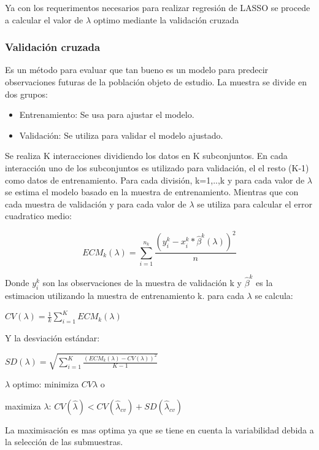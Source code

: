 \documentclass[
]{article}
\newenvironment{Shaded}{\begin{snugshade}}{\end{snugshade}}
\newcommand{\AttributeTok}[1]{\textcolor[rgb]{0.77,0.63,0.00}{#1}}
\newcommand{\DecValTok}[1]{\textcolor[rgb]{0.00,0.00,0.81}{#1}}
\newcommand{\FunctionTok}[1]{\textcolor[rgb]{0.00,0.00,0.00}{#1}}
\newcommand{\NormalTok}[1]{#1}
\newcommand{\OtherTok}[1]{\textcolor[rgb]{0.56,0.35,0.01}{#1}}
\newcommand{\SpecialCharTok}[1]{\textcolor[rgb]{0.00,0.00,0.00}{#1}}
\begin{document}
Ya con los requerimentos necesarios para realizar regresión de LASSO se
procede a calcular el valor de \(\lambda\) optimo mediante la validación
cruzada

\hypertarget{validaciuxf3n-cruzada}{%
\subsubsection{Validación cruzada}\label{validaciuxf3n-cruzada}}

Es un método para evaluar que tan bueno es un modelo para predecir
observaciones futuras de la población objeto de estudio. La muestra se
divide en dos grupos:

\begin{itemize}
\item
  Entrenamiento: Se usa para ajustar el modelo.
\item
  Validación: Se utiliza para validar el modelo ajustado.
\end{itemize}

Se realiza K interacciones dividiendo los datos en K subconjuntos. En
cada interacción uno de los subconjuntos es utilizado para validación,
el el resto (K-1) como datos de entrenamiento. Para cada división,
k=1,..,k y para cada valor de \(\lambda\) se estima el modelo basado en
la muestra de entrenamiento. Mientras que con cada muestra de validación
y para cada valor de \(\lambda\) se utiliza para calcular el error
cuadratico medio:

\[ECM_k(\lambda)= \sum_{i=1}^{n_k}\frac{(y_i^k- x_i^k*\hat{\beta}^k(\lambda))^2}{n}\]

Donde \(y_i^k\) son las observaciones de la muestra de validación k y
\(\hat{\beta}^k\) es la estimacion utilizando la muestra de
entrenamiento k. para cada \(\lambda\) se calcula:

\(CV(\lambda)=\frac{1}{k}\sum_{i=1}^{K}ECM_k(\lambda)\)

Y la desviación estándar:

\(SD(\lambda)=\sqrt{\sum_{i=1}^{K}\frac{(ECM_k(\lambda)-CV(\lambda))^2}{K-1}}\)

\(\lambda\) optimo: minimiza \(CV{\lambda}\) o

maximiza \(\lambda\):
\(CV(\hat{\lambda}) < CV(\hat{\lambda}_{cv})+SD(\hat{\lambda}_{cv})\)

La maximisación es mas optima ya que se tiene en cuenta la variabilidad
debida a la selección de las submuestras.

\begin{Shaded}
\end{Shaded}
\end{document}

